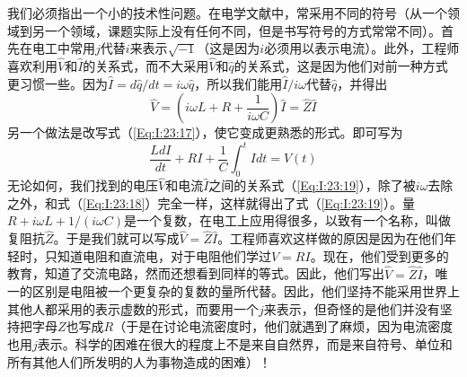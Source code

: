 \begin{table}[H]
    \centering
    \caption{}
    \label{Table:23:1}
\end{table}

我们必须指出一个小的技术性问题。在电学文献中，常采用不同的符号（从一个领域到另一个领域，课题实际上没有任何不同，但是书写符号的方式常常不同）。首先在电工中常用$j$代替$i$来表示$\sqrt{-1}$（这是因为$i$必须用以表示电流）。此外，工程师喜欢利用$\hat{V}$和$\hat{I}$的关系式，而不大采用$\hat{V}$和$\hat{q}$的关系式，这是因为他们对前一种方式更习惯一些。因为$\hat{I}=d\hat{q}/dt=i\omega\hat{q}$，所以我们能用$\hat{I}/i\omega$代替$\hat{q}$，并得出
\begin{equation}
    \label{Eq:I:23:19}
    \hat{V}=\left ( i\omega L + R + \frac{1}{i\omega C} \right ) \hat{I} = \hat{Z}\hat{I}
\end{equation}
另一个做法是改写式（\ref{Eq:I:23:17}），使它变成更熟悉的形式。即可写为
\begin{equation}
    \label{Eq:I:23:20}
    \frac{LdI}{dt} + RI + \frac{1}{C}\int_0^tIdt=V(t)
\end{equation}
无论如何，我们找到的电压$\hat{V}$和电流$\hat{I}$之间的关系式（\ref{Eq:I:23:19}），除了被$i\omega$去除之外，和式（\ref{Eq:I:23:18}）完全一样，这样就得出了式（\ref{Eq:I:23:19}）。量$R+i\omega L+1/(i\omega C)$是一个复数，在电工上应用得很多，以致有一个名称，叫做复阻抗$\hat{Z}$。于是我们就可以写成$\hat{V}=\hat{Z}\hat{I}$。工程师喜欢这样做的原因是因为在他们年轻时，只知道电阻和直流电，对于电阻他们学过$V=RI$。现在，他们受到更多的教育，知道了交流电路，然而还想看到同样的等式。因此，他们写出$\hat{V}=\hat{Z}\hat{I}$，唯一的区别是电阻被一个更复杂的复数的量所代替。因此，他们坚持不能采用世界上其他人都采用的表示虚数的形式，而要用一个$j$来表示，但奇怪的是他们并没有坚持把字母$Z$也写成$R$（于是在讨论电流密度时，他们就遇到了麻烦，因为电流密度也用$j$表示。科学的困难在很大的程度上不是来自自然界，而是来自符号、单位和所有其他人们所发明的人为事物造成的困难）！

